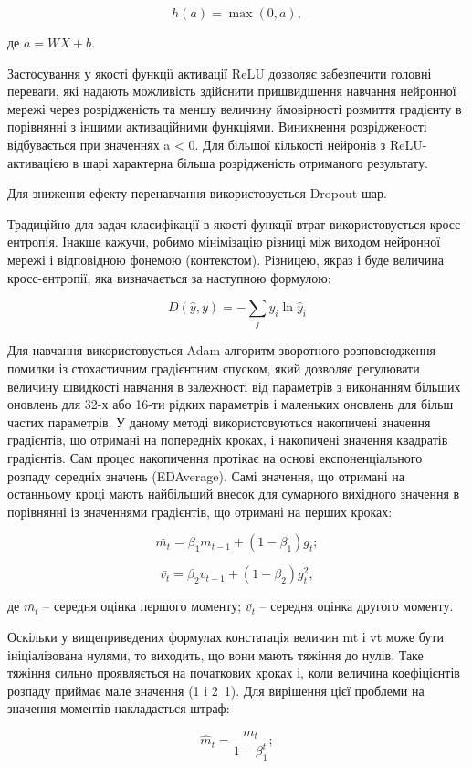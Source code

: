\[
h(a) = \max(0, a),
\]

\noindent
де $a=WX+b$.

Застосування у якості функції активації ReLU дозволяє забезпечити головні переваги, які надають можливість здійснити пришвидшення навчання нейронної мережі через розрідженість та меншу величину ймовірності розмиття градієнту в порівнянні з іншими активаційними функціями. Виникнення розрідженості відбувається при значеннях a < 0. Для більшої кількості нейронів з ReLU-активацією в шарі характерна більша розрідженість отриманого результату.

Для зниження ефекту перенавчання використовується Dropout шар.

Традиційно для задач класифікації в якості функції втрат використовується кросс-ентропія. Інакше кажучи, робимо мінімізацію різниці між виходом нейронної мережі і відповідною фонемою (контекстом). Різницею, якраз і буде величина кросс-ентропії, яка визначається за наступною формулою:

\[
D(\hat{y},y)=-\sum_j y_i \ln \hat{y}_i
\]

Для навчання використовується Adam-алгоритм зворотного розповсюдження помилки із стохастичним градієнтним спуском, який дозволяє регулювати величину швидкості навчання в залежності від параметрів з виконанням більших оновлень для 32-х або 16-ти рідких параметрів і маленьких оновлень для більш частих параметрів. У даному методі використовуються накопичені значення градієнтів, що отримані на попередніх кроках, і накопичені значення квадратів градієнтів. Сам процес накопичення протікає на основі експоненціального розпаду середніх значень (EDAverage). Самі значення, що отримані на останньому кроці мають найбільший внесок для сумарного вихідного значення в порівнянні із значеннями градієнтів, що отримані на перших кроках:

\[
\bar{m_t}=\beta_1m_{t-1}+(1-\beta_1)g_t;
\]

\[
\bar{v_t}=\beta_2v_{t-1}+(1-\beta_2)g^2_t,
\]

\noindent
де $\bar{m_t}$ – середня оцінка першого моменту; $\bar{v_t}$ – середня оцінка другого моменту.

Оскільки у вищеприведених формулах констатація величин mt і vt може бути ініціалізована нулями, то виходить, що вони мають тяжіння до нулів. Таке тяжіння сильно проявляється на початкових кроках і, коли величина коефіцієнтів розпаду приймає мале значення (1 і 2~1). Для вирішення цієї проблеми на значення моментів накладається штраф:

\[
\hat{m}_t=\frac{m_t}{1-\beta_1^t};
\]

